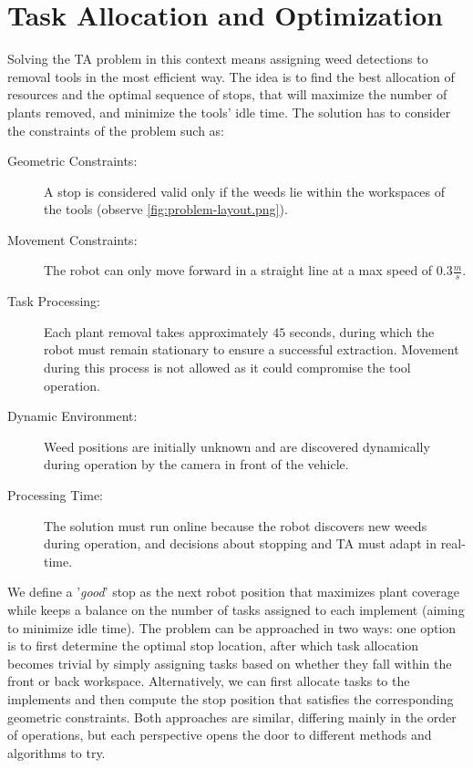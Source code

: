 \chapter{Task Allocation and Optimization}\label{ch:TA} %
 Solving the \ac{TA} problem in this context means assigning weed detections to removal tools in the most efficient way. The idea is to find the best allocation of resources and the optimal sequence of stops, that will maximize the number of plants removed, and minimize the tools' idle time. The solution has to consider the constraints of the problem such as:

\begin{description}
    \item[Geometric Constraints:] A stop is considered valid only if the weeds lie within the workspaces of the tools (observe \autoref{fig:problem-layout.png}).
    \item[Movement Constraints:] The robot can only move forward in a straight line at a max speed of $0.3\frac{m}{s}$. %
    \item[Task Processing:] Each plant removal takes approximately $45$ seconds, during which the robot must remain stationary to ensure a successful extraction. Movement during this process is not allowed as it could compromise the tool operation.
    \item[Dynamic Environment:] Weed positions are initially unknown and are discovered dynamically during operation by the camera in front of the vehicle.
    \item[Processing Time:] The solution must run online because the robot discovers new weeds during operation, and decisions about stopping and \ac{TA} must adapt in real-time.
\end{description}

We define a '\textit{good}' stop as the next robot position that maximizes plant coverage while keeps a balance on the number of tasks assigned to each implement (aiming to minimize idle time). The problem can be approached in two ways: one option is to first determine the optimal stop location, after which task allocation becomes trivial by simply assigning tasks based on whether they fall within the front or back workspace. Alternatively, we can first allocate tasks to the implements and then compute the stop position that satisfies the corresponding geometric constraints. Both approaches are similar, differing mainly in the order of operations, but each perspective opens the door to different methods and algorithms to try.

